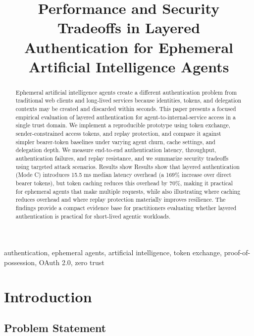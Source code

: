\documentclass[conference,10pt]{IEEEtran}
\begin{document}
\title{Performance and Security Tradeoffs in Layered Authentication for Ephemeral Artificial Intelligence Agents}

\author{
}

\maketitle

\begin{abstract}
Ephemeral artificial intelligence agents create a different authentication problem from traditional web clients and long-lived services because identities, tokens, and delegation contexts may be created and discarded within seconds. This paper presents a focused empirical evaluation of layered authentication for agent-to-internal-service access in a single trust domain. We implement a reproducible prototype using token exchange, sender-constrained access tokens, and replay protection, and compare it against simpler bearer-token baselines under varying agent churn, cache settings, and delegation depth. We measure end-to-end authentication latency, throughput, authentication failures, and replay resistance, and we summarize security tradeoffs using targeted attack scenarios. Results show Results show that layered authentication (Mode C) introduces 15.5 ms median latency overhead (a 169\% increase over direct bearer tokens), but token caching reduces this overhead by 70\%, making it practical for ephemeral agents that make multiple requests, while also illustrating where caching reduces overhead and where replay protection materially improves resilience. The findings provide a compact evidence base for practitioners evaluating whether layered authentication is practical for short-lived agentic workloads.
\end{abstract}

\begin{IEEEkeywords}
authentication, ephemeral agents, artificial intelligence, token exchange, proof-of-possession, OAuth 2.0, zero trust
\end{IEEEkeywords}

\section{Introduction}

\subsection{Problem Statement}
\end{document}

